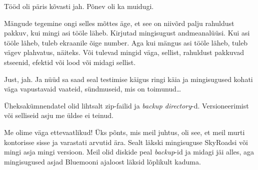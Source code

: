 
Tööd oli päris kõvasti jah. Põnev oli ka muidugi.


Mängude tegemine ongi selles mõttes äge, et see on  niivõrd palju rahuldust 
pakkuv, kui mingi asi tööle läheb. Kirjutad mingisugust andmeanalüüsi. Kui asi 
tööle läheb, tuleb ekraanile õige number. Aga kui mängus asi tööle läheb, tuleb 
vägev plahvatus, näiteks. Või tulevad mingid väga, sellist, rahuldust pakkuvad 
stseenid,  efektid või lood või midagi sellist. 


Just, jah. Ja nüüd sa saad seal testimise käigus  ringi käia ja mingisugused 
kohati väga vapustavaid vaateid, sündmuseid, mis on toimunud\ldots


Üheksakümnendatel olid lihtsalt zip-failid ja \emph{backup directory}-d. 
Versioneerimist või selliseid  asju me üldse ei teinud. 


Me olime väga ettevaatlikud! Üks põnts, mis meil juhtus, oli see, et meil murti 
kontorisse sisse ja varastati arvutid ära. Sealt läkski mingisuguse SkyRoadsi 
või mingi asja mingi versioon. Meil olid diskide peal \emph{backup}-id ja 
midagi jäi alles, aga mingisugused asjad Bluemooni ajaloost läksid lõplikult 
kaduma. 


